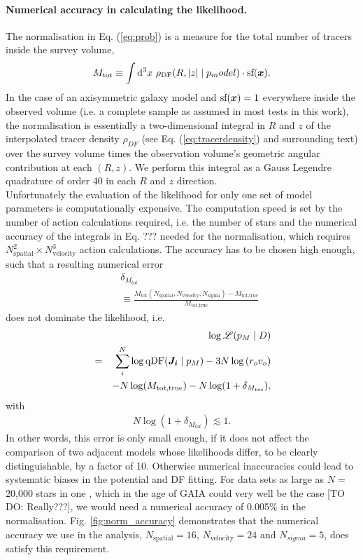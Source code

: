 \paragraph{Numerical accuracy in calculating the likelihood.} The normalisation in Eq. (\ref{eq:prob}) is a measure for the total number of tracers inside the survey volume,
\begin{equation}
M_\text{tot} \equiv \int \mathop{}\!\mathrm{d^3} x \  \rho_\text{DF}(R,|z| \mid p_model) \cdot \text{sf}(\boldsymbol{x}).\label{eq:normalisation}
\end{equation}
In the case of an axisymmetric galaxy model and $\text{sf}(\boldsymbol{x})=1$ everywhere inside the observed volume (i.e. a complete sample as assumed in most tests in this work), the normalisation is essentially a two-dimensional integral in $R$ and $z$ of the interpolated tracer density $\rho_{DF}$ (see Eq. (\ref{eq:tracerdensity}) and surrounding text) over the survey volume times the observation volume's geometric angular contribution at each $(R,z)$. We perform this integral as a Gauss Legendre quadrature of order 40 in each $R$ and $z$ direction.
\\Unfortunately the evaluation of the likelihood for only one set of model parameters is computationally expensive. The computation speed is set by the number of action calculations required, i.e. the number of stars and the numerical accuracy of the integrals in Eq. ??? needed for the normalisation, which requires $N_\text{spatial}^2 \times N_\text{velocity}^3$ action calculations. The accuracy has to be chosen high enough, such that a resulting numerical error 
\begin{eqnarray}
&&\delta_{M_{tot}} \nonumber\\
&&\equiv \frac{M_\text{tot}(N_\text{spatial},N_\text{velocity},N_\text{sigma}) -  M_\text{tot,true} }{M_\text{tot,true}}\label{eq:relerrlikelihood}
\end{eqnarray}
does not dominate the likelihood, i.e.
\begin{eqnarray}
& &\log \mathscr{L}(p_M \mid D) \nonumber\\
&=& \sum_i^{N} \log \text{qDF}(\boldsymbol{J_i} \mid p_M) - 3N \log \left( r_o v_o\right)\nonumber\\
& & -N \log(M_\text{tot,true}) - N \log (1 + \delta_{M_{tot}}),\label{eq:loglikelihood_relerr}
\end{eqnarray}
with
\begin{eqnarray}
N \log (1 + \delta_{M_{tot}}) \lesssim 1.\nonumber
\end{eqnarray}
In other words, this error is only small enough, if it does not affect the comparison of two adjacent models whose likelihoods differ, to be clearly distinguishable, by a factor of 10. Otherwise numerical inaccuracies could lead to systematic biases in the potential and DF fitting. For data sets as large as $N =$ 20,000 stars in one \MAP, which in the age of GAIA could very well be the case [TO DO: Really???], we would need a numerical accuracy of 0.005\% in the normalisation. Fig. \ref{fig:norm_accuracy} demonstrates that the numerical accuracy we use in the analysis, $N_\text{spatial}=16$, $N_\text{velocity}=24$ and $N_{sigma}=5$, does satisfy this requirement.

